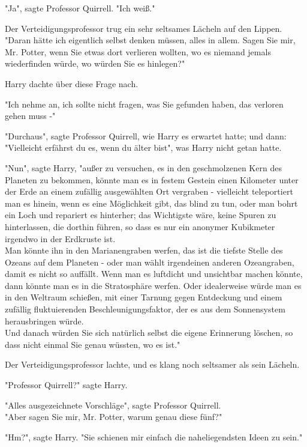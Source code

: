 {"Ja", sagte Professor Quirrell. "Ich weiß."

Der Verteidigungsprofessor trug ein sehr seltsames Lächeln auf den Lippen.\\ "Daran hätte ich eigentlich selbst denken müssen, alles in allem. Sagen Sie mir, Mr. Potter, wenn Sie etwas dort verlieren wollten, wo es niemand jemals wiederfinden würde, wo würden Sie es hinlegen?"

Harry dachte über diese Frage nach.

"Ich nehme an, ich sollte nicht fragen, was Sie gefunden haben, das verloren gehen muss -"

"Durchaus", sagte Professor Quirrell, wie Harry es erwartet hatte; und dann:\\ "Vielleicht erfährst du es, wenn du älter bist", was Harry nicht getan hatte.

"Nun", sagte Harry, "außer zu versuchen, es in den geschmolzenen Kern des Planeten zu bekommen, könnte man es in festem Gestein einen Kilometer unter der Erde an einem zufällig ausgewählten Ort vergraben - vielleicht teleportiert man es hinein, wenn es eine Möglichkeit gibt, das blind zu tun, oder man bohrt ein Loch und repariert es hinterher; das Wichtigste wäre, keine Spuren zu hinterlassen, die dorthin führen, so dass es nur ein anonymer Kubikmeter irgendwo in der Erdkruste ist.\\ Man könnte ihn in den Marianengraben werfen, das ist die tiefste Stelle des Ozeans auf dem Planeten - oder man wählt irgendeinen anderen Ozeangraben, damit es nicht so auffällt. Wenn man es luftdicht und unsichtbar machen könnte, dann könnte man es in die Stratosphäre werfen. Oder idealerweise würde man es in den Weltraum schießen, mit einer Tarnung gegen Entdeckung und einem zufällig fluktuierenden Beschleunigungsfaktor, der es aus dem Sonnensystem herausbringen würde.\\ Und danach würden Sie sich natürlich selbst die eigene Erinnerung löschen, so dass nicht einmal Sie genau wüssten, wo es ist."

Der Verteidigungsprofessor lachte, und es klang noch seltsamer als sein Lächeln.

"Professor Quirrell?" sagte Harry.

"Alles ausgezeichnete Vorschläge", sagte Professor Quirrell.\\ "Aber sagen Sie mir, Mr. Potter, warum genau diese fünf?"

"Hm?", sagte Harry. "Sie schienen mir einfach die naheliegendsten Ideen zu sein."

}
